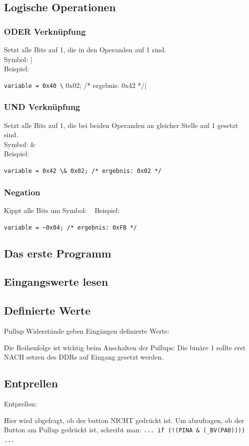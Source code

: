 \documentclass{beamer}
\begin{document}
\subsection{Logische Operationen}
\frame
{
	\frametitle{ODER Verkn\"upfung}
	Setzt alle Bits auf 1, die in den Operanden auf 1 sind.\\
	Symbol: |\\
	Beispiel:
	\par\lstinline|variable = 0x40 \| 0x02; /* ergebnis: 0x42 */|
}
\frame
{
	\frametitle{UND Verkn\"upfung}
	Setzt alle Bits auf 1, die bei beiden Operanden an gleicher Stelle auf 1 gesetzt sind.\\
	Symbol: \&\\
	Beispiel:
	\par\lstinline|variable = 0x42 \& 0x02; /* ergebnis: 0x02 */|
}
\frame
{
	\frametitle{Negation}
	Kippt alle Bits um
	Symbol: ~
	Beispiel:
	\par\lstinline|variable = ~0x04; /* ergebnis: 0xFB */|
}
\subsection{Das erste Programm}
\frame
{
	\begin{small}
	
	\end{small}
}
\subsection{Eingangswerte lesen}
\frame
{
	\begin{small}
	
	\end{small}
}
\subsection{Definierte Werte}
\frame
{
	Pullup Widerst\"ande geben Eing\"angen definierte Werte:
	\begin{small}
	
	\end{small}
	Die Reihenfolge ist wichtig beim Anschalten der Pullups: Die bin\"are 1
	sollte erst NACH setzen des DDRs auf Eingang gesetzt werden.
}
\subsection{Entprellen}
\frame
{
	Entprellen:
	\begin{small}
	
	Hier wird abgefragt, ob der button NICHT gedr\"uckt ist.
	Um abzufragen, ob der Button am Pullup gedr\"uckt ist, schreibt man:
	\lstinline|... if (!(PINA & (_BV(PA0)))) ...|
	\end{small}
}
\end{document}
